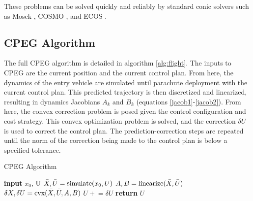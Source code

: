 These problems can be solved quickly and reliably by standard conic solvers such as Mosek \cite{mosekaps2014}, COSMO \cite{garstka2020}, and ECOS \cite{domahidi2013}.
 \subsection{CPEG Algorithm}
 The full CPEG algorithm is detailed in algorithm \ref{alg:flight}. The inputs to CPEG are the current position and the current control plan. From here, the dynamics of the entry vehicle are simulated until parachute deployment with the current control plan. This predicted trajectory is then discretized and linearized, resulting in dynamics Jacobians $A_k$ and $B_k$ (equations \eqref{jacob1}-\eqref{jacob2}). From here, the convex correction problem is posed given the control configuration and cost strategy. This convex optimization problem is solved, and the correction $\delta U$ is used to correct the control plan. The prediction-correction steps are repeated until the norm of the correction being made to the control plan is below a specified tolerance. 
  \begin{algorithm} 
	\begin{algorithmic}[1]
		\caption{CPEG Algorithm}\label{alg:flight}
		\State \textbf{input} $x_0$, U  
    		\State $\Bar{X}, \Bar{U} = \text{simulate}(x_0,U)$ 
    		\State $A,B = \text{linearize}(\Bar{X}, \Bar{U})$ 
    		\State $\delta X,\delta U = \text{cvx}(\Bar{X}, \Bar{U}, A, B)$  
    	    \State $U \mathrel{+}= \delta U $ 
		\EndWhile
		\State \textbf{return} $U$ 
	\end{algorithmic}
\end{algorithm}

